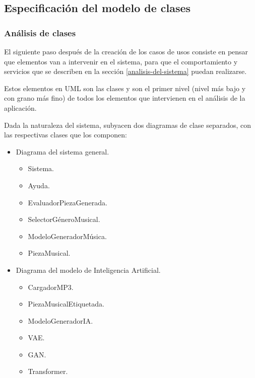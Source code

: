 
\subsection{Especificación del modelo de clases}
\label{especificacion-modelo-clases}
\subsubsection{Análisis de clases}

El siguiente paso después de la creación de los casos de usos consiste en pensar que elementos van a intervenir en el sistema, para que el comportamiento y servicios que se describen en la sección \ref{analisis-del-sistema} puedan realizarse.

Estos elementos en UML son las clases y son el primer nivel (nivel más bajo y con grano más fino) de todos los elementos que intervienen en el análisis de la aplicación.

Dada la naturaleza del sistema, subyacen dos diagramas de clase separados, con las respectivas clases que los componen:
\begin{itemize}
    \item Diagrama del sistema general.
    \begin{itemize}
        \item Sistema.
        \item Ayuda.
        \item EvaluadorPiezaGenerada.
        \item SelectorGéneroMusical.
        \item ModeloGeneradorMúsica.
        \item PiezaMusical.
    \end{itemize}
    \item Diagrama del modelo de Inteligencia Artificial.
    \begin{itemize}
        \item CargadorMP3.
        \item PiezaMusicalEtiquetada.
        \item ModeloGeneradorIA.
        \item VAE.
        \item GAN.
        \item Transformer.
    \end{itemize}
\end{itemize}

